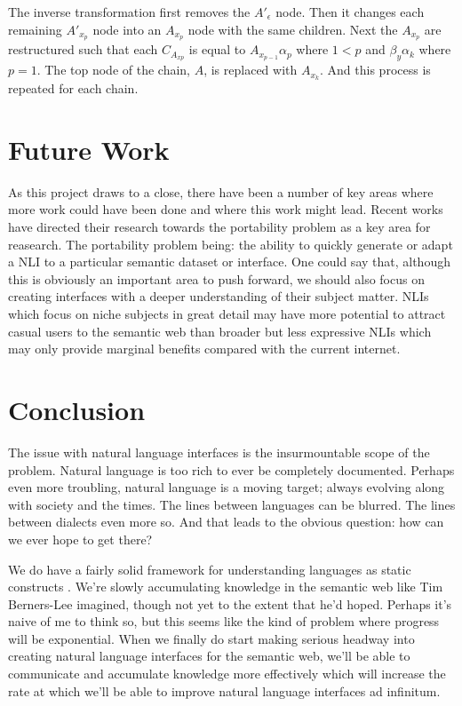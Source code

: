 \documentclass[11pt]{article}
\begin{document}
The inverse transformation first removes the $A'_\epsilon$ node. Then it changes each remaining $A'_{x_p}$ node into an $A_{x_p}$ node
with the same children. Next the $A_{x_p}$ are restructured such that each $C_{A_{x p}}$
is equal to $A_{x_{p-1}} \alpha_p$ where $1 < p$ and $\beta_y \alpha_k$ where $p=1$. The top node of the chain, 
$A$, is replaced with $A_{x_k}$. And this process is repeated for each chain.

\section{Future Work}
As this project draws to a close, there have been a number of key areas where more work
could have been done and where this work might lead. 
Recent works have directed their research towards the portability problem as a key area 
for reasearch. The portability problem being: the ability to quickly generate or adapt 
a NLI to a particular semantic dataset or interface. 
One could say that, although this is obviously
an important area to push forward, we should also focus on creating interfaces with a
deeper understanding of their subject matter. NLIs which focus on niche subjects in great
detail may have more potential to attract casual users to the semantic web than broader
but less expressive NLIs which may only provide marginal benefits compared with the 
current internet.

\section{Conclusion}
The issue with natural language interfaces is the insurmountable scope of the problem. 
Natural language is too rich to ever be completely documented. Perhaps even more troubling,
natural language is a moving target; always evolving along with society and the times.
The lines between languages can be blurred. The lines between dialects even more so.
And that leads to the obvious question: how can we ever hope to get there?

We do have a fairly solid framework for understanding languages as static constructs
\cite{chomsky}. We're slowly accumulating knowledge in the semantic web like 
Tim Berners-Lee imagined, though not yet to the extent that he'd hoped. Perhaps it's
naive of me to think so, but this seems like the kind of problem where progress
will be exponential. When we finally do start making serious headway into creating
natural language interfaces for the semantic web, we'll be able to communicate and
accumulate knowledge more effectively which will increase the rate at which we'll be
able to improve natural language interfaces ad infinitum.
\end{document}
